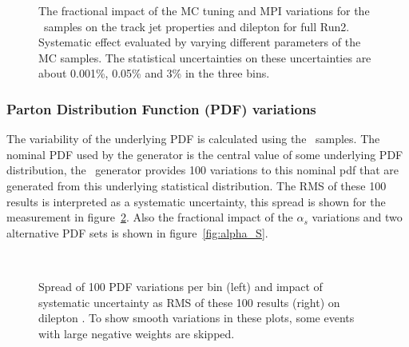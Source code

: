 \begin{figure}[h!]
  \caption{The fractional impact of the MC tuning and MPI variations for the \pythia~samples on the track jet properties and dilepton \pt for full Run2. Systematic effect evaluated by varying different parameters of the MC samples. The statistical uncertainties on these uncertainties are about 0.001\%, 0.05\% and 3\% in the three bins.}
  \label{fig:PS_MPI}
\end{figure}

\subsubsection{Parton Distribution Function (PDF) variations}
The variability of the underlying PDF is calculated using the \sherpa~samples. The nominal PDF used by the generator is the central value of some underlying PDF distribution, the \sherpa~generator provides 100 variations to this nominal pdf that are generated from this underlying statistical distribution.  The RMS of these 100 results is interpreted as a systematic uncertainty, this spread is shown for the measurement in figure~\ref{fig:PDF_RMS}. Also the fractional impact of the $\alpha_{s}$ variations and two alternative PDF sets is shown in figure~\ref{fig:alpha_S}.
\begin{figure}[h!]
  \centering
   \\
  \caption{Spread of 100 PDF variations per bin (left) and impact of systematic uncertainty as RMS of these 100 results (right) on dilepton \pt. To show smooth variations in these plots, some events with large negative weights are skipped.}
  \label{fig:PDF_RMS}
\end{figure}

